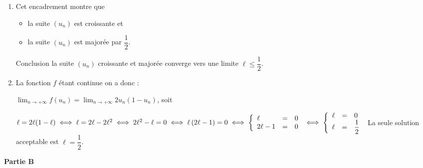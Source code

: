 \begin{enumerate}
\begin{itemize}
La relation est vraie au rang 0 et si elle est vraie au rang $n \in \N$ elle l'est encore au rang $n + 1$ : d'après le principe de récurrence on a démontré que :

pour tout rentier naturel $n,\: u_n \leqslant u_{n+1} \leqslant \dfrac12$
\end{itemize}

\item %
Cet encadrement montre que 
\begin{itemize}
\item la suite $\left(u_n\right)$ est croissante et
\item la suite $\left(u_n\right)$ est majorée par $\dfrac12$.
\end{itemize}

Conclusion la suite $\left(u_n\right)$ croissante et majorée converge vers une limite $\ell \leqslant \dfrac12$.

\item %
La fonction $f$ étant continue on a donc :

$\displaystyle\lim_{n \to + \infty} f\left(u_n\right) = \displaystyle\lim_{n \to + \infty} 2u_n\left(1 - u_n\right)$, soit 

$\ell = 2\ell(1 - \ell) \iff \ell = 2\ell - 2\ell^2 \iff 2\ell^2 - \ell = 0 \iff \ell\left(2\ell - 1\right) = 0 \iff \left\{\begin{array}{l c l}
\ell&=&0\\
2\ell - 1&=&0
\end{array}\right. \iff \left\{\begin{array}{l c l}
\ell&=&0\\
\ell &=&\dfrac12
\end{array}\right.$ La seule solution acceptable est $\ell = \dfrac12$.
\end{enumerate}

\bigskip

\textbf{Partie B}

\medskip

%
%
%
%


